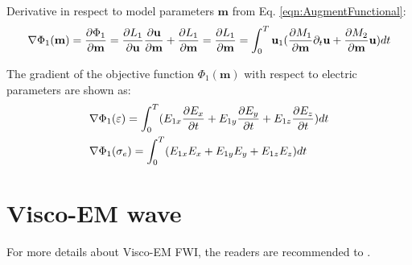 \documentclass[pdftex,a4paper,parskip,listof=totoc,bibliography=totoc,onehalfspacing,12pt]{scrreprt}
\begin{document}
\par Derivative in respect to model parameters $\mathbf{m}$ from Eq. \ref{eqn:AugmentFunctional}:
\begin{equation}
 \nabla \Phi_1(\mathbf{m})=\pdv{\Phi_1}{\mathbf{m}} = \pdv{L_1}{\mathbf{u}}\pdv{\mathbf{u}}{\mathbf{m}} + \pdv{L_1}{\mathbf{m}} =  \pdv{L_1}{\mathbf{m}} = \int_0^T \mathbf{u}_{1} (\pdv{M_{1}}{\mathbf{m}} \partial_{t}\mathbf{u} + \pdv{M_{2}}{\mathbf{m}} \mathbf{u} ) dt\\ 
\end{equation}
\par The gradient of the objective function $\Phi_1(\mathbf{m})$ with respect to electric parameters are shown as:
\begin{equation}
\label{eqn:GradientAdjoint1}
\begin{align*}
& \nabla \Phi_1(\varepsilon) = \int_0^T ( E_{1x} \pdv{E_x}{t} + E_{1y} \pdv{E_y}{t} + E_{1z} \pdv{E_z}{t} ) dt\\
& \nabla \Phi_1(\sigma_e) = \int_0^T ( E_{1x} E_x + E_{1y} E_y + E_{1z} E_z  ) dt\\
\end{align*}
\end{equation}

\chapter{Visco-EM wave}
\label{sec:Visco_EM_wave_equation}
For more details about Visco-EM FWI, the readers are recommended to \cite{qin2020full}.
\end{document}
